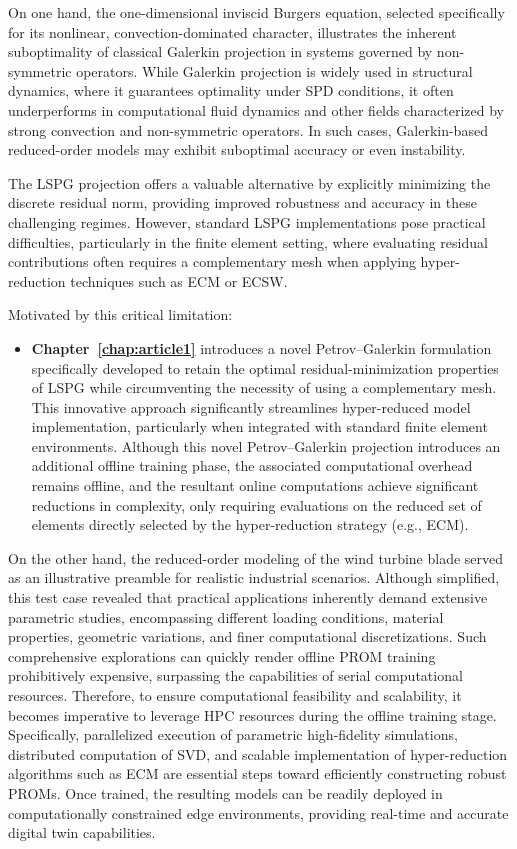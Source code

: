 On one hand, the one-dimensional inviscid Burgers equation, selected specifically for its nonlinear, convection-dominated character, illustrates the inherent suboptimality of classical Galerkin projection in systems governed by non-symmetric operators. While Galerkin projection is widely used in structural dynamics, where it guarantees optimality under SPD conditions, it often underperforms in computational fluid dynamics and other fields characterized by strong convection and non-symmetric operators. In such cases, Galerkin-based reduced-order models may exhibit suboptimal accuracy or even instability.

The LSPG projection offers a valuable alternative by explicitly minimizing the discrete residual norm, providing improved robustness and accuracy in these challenging regimes. However, standard LSPG implementations pose practical difficulties, particularly in the finite element setting, where evaluating residual contributions often requires a complementary mesh when applying hyper-reduction techniques such as ECM or ECSW.

Motivated by this critical limitation:
\begin{itemize}
    \item \textbf{Chapter~\ref{chap:article1}} introduces a novel Petrov--Galerkin formulation specifically developed to retain the optimal residual-minimization properties of LSPG while circumventing the necessity of using a complementary mesh. This innovative approach significantly streamlines hyper-reduced model implementation, particularly when integrated with standard finite element environments. Although this novel Petrov--Galerkin projection introduces an additional offline training phase, the associated computational overhead remains offline, and the resultant online computations achieve significant reductions in complexity, only requiring evaluations on the reduced set of elements directly selected by the hyper-reduction strategy (e.g., ECM).
\end{itemize}

On the other hand, the reduced-order modeling of the wind turbine blade served as an illustrative preamble for realistic industrial scenarios. Although simplified, this test case revealed that practical applications inherently demand extensive parametric studies, encompassing different loading conditions, material properties, geometric variations, and finer computational discretizations.
Such comprehensive explorations can quickly render offline PROM training prohibitively expensive, surpassing the capabilities of serial computational resources. Therefore, to ensure computational feasibility and scalability, it becomes imperative to leverage HPC resources during the offline training stage. Specifically, parallelized execution of parametric high-fidelity simulations, distributed computation of SVD, and scalable implementation of hyper-reduction algorithms such as ECM are essential steps toward efficiently constructing robust PROMs. Once trained, the resulting models can be readily deployed in computationally constrained edge environments, providing real-time and accurate digital twin capabilities.


